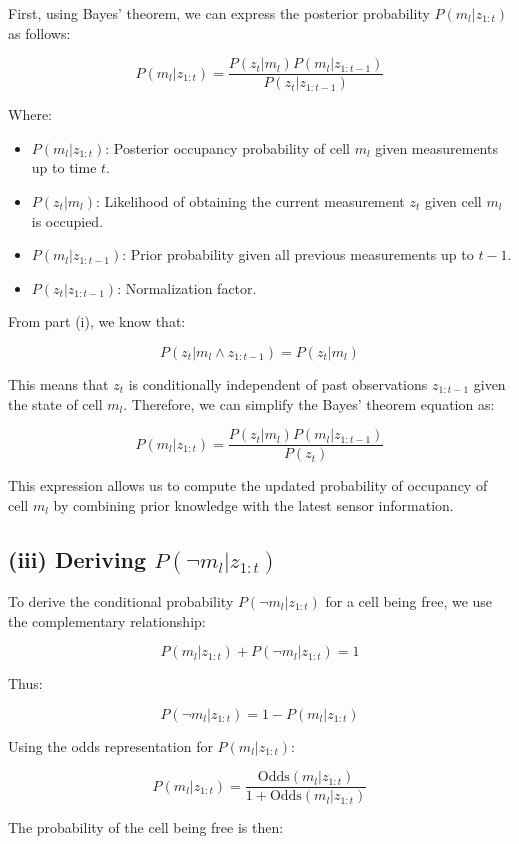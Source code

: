 \documentclass[template,12pt,a4paper,enabledeprecatedfontcommands]{template}
\begin{document}
\noindent First, using Bayes' theorem, we can express the posterior probability \( P(m_l | z_{1:t}) \) as follows:

\[
P(m_l | z_{1:t}) = \frac{P(z_t | m_l) P(m_l | z_{1:t-1})}{P(z_t | z_{1:t-1})}
\]

Where:
\begin{itemize}
    \item \( P(m_l | z_{1:t}) \): Posterior occupancy probability of cell \( m_l \) given measurements up to time \( t \).
    \item \( P(z_t | m_l) \): Likelihood of obtaining the current measurement \( z_t \) given cell \( m_l \) is occupied.
    \item \( P(m_l | z_{1:t-1}) \): Prior probability given all previous measurements up to \( t-1 \).
    \item \( P(z_t | z_{1:t-1}) \): Normalization factor.
\end{itemize}

From part (i), we know that:

\[
P(z_t | m_l \land z_{1:t-1}) = P(z_t | m_l)
\]

\noindent This means that \( z_t \) is conditionally independent of past observations \( z_{1:t-1} \) given the state of cell \( m_l \). Therefore, we can simplify the Bayes' theorem equation as:

\[
P(m_l | z_{1:t}) = \frac{P(z_t | m_l) P(m_l | z_{1:t-1})}{P(z_t)}
\]

\noindent This expression allows us to compute the updated probability of occupancy of cell \( m_l \) by combining prior knowledge with the latest sensor information.


\subsection*{(iii) Deriving \( P(\neg m_l | z_{1:t}) \)}
To derive the conditional probability \( P(\neg m_l | z_{1:t}) \) for a cell being free, we use the complementary relationship:

\[
P(m_l | z_{1:t}) + P(\neg m_l | z_{1:t}) = 1
\]

Thus:

\[
P(\neg m_l | z_{1:t}) = 1 - P(m_l | z_{1:t})
\]

Using the odds representation for \( P(m_l | z_{1:t}) \):

\[
P(m_l | z_{1:t}) = \frac{\text{Odds}(m_l | z_{1:t})}{1 + \text{Odds}(m_l | z_{1:t})}
\]

\noindent The probability of the cell being free is then:
\end{document}
